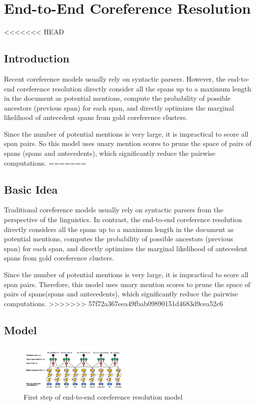 \documentclass[11pt]{article}
\begin{document}
\section{End-to-End Coreference Resolution}

<<<<<<< HEAD
\subsection{Introduction}
Recent coreference models usually rely on syntactic parsers. However, the end-to-end coreference resolution directly consider all the spans up to a maximum length in the document as potential mentions,  compute the probability of possible ancestors (previous span) for each span, and directly optimizes the marginal likelihood of antecedent spans from gold coreference clusters.

Since the number of potential mentions is very large, it is impractical to score all span pairs. So this model uses unary mention scores to prune the space of pairs of spans (spans and antecedents), which significantly reduce the pairwise computations.
=======
\subsection{Basic Idea}
Traditional coreference models usually rely on syntactic parsers from the perspective of the linguistics. In contrast, the end-to-end coreference resolution directly considers all the spans up to a maximum length in the document as potential mentions,  computes the probability of possible ancestors (previous span) for each span, and directly optimizes the marginal likelihood of antecedent spans from gold coreference clusters.

Since the number of potential mentions is very large, it is impractical to score all span pairs. Therefore, this model uses unary mention scores to prune the space of pairs of spans(spans and antecedents), which significantly reduce the pairwise computations.
>>>>>>> 57f72a367eea49fbab09890151d4683d9cea52c6

\subsection{Model}

\begin{figure}[h]
                
 \includegraphics[width=0.5\textwidth]{02.jpg}
 \caption{First step of end-to-end coreference resolution model}
                
\end{figure}
\end{document}
